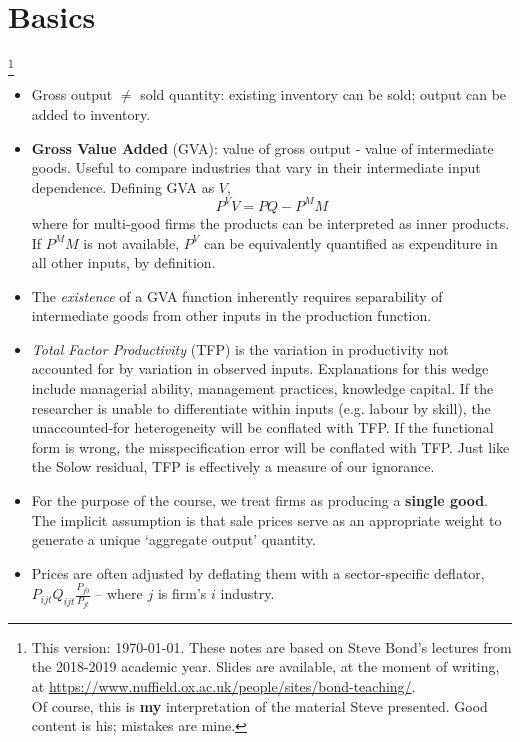 \documentclass[11pt]{article}
\newcommand\blfootnote[1]{%
	\begingroup
	\renewcommand\thefootnote{}\footnote{#1}%
	\addtocounter{footnote}{-1}%
	\endgroup
}
\begin{document}
\onehalfspacing

\tableofcontents

\section{Basics}

\blfootnote{This version: \today. These notes are based on Steve Bond's lectures from the 2018-2019 academic year. Slides are available, at the moment of writing, at \url{https://www.nuffield.ox.ac.uk/people/sites/bond-teaching/}.\\
Of course, this is \textbf{my} interpretation of the material Steve presented. Good content is his; mistakes are mine.}

\begin{itemize}
	\item Gross output $\neq$ sold quantity: existing inventory can be sold; output can be added to inventory.
	\item \textbf{Gross Value Added} (GVA): value of gross output - value of intermediate goods.
	Useful to compare industries that vary in their intermediate input dependence.
	Defining GVA as $V$,
	\begin{equation}
		P^V V = PQ - P^M M
	\end{equation}
	where for multi-good firms the products can be interpreted as inner products.
	If $P^M M$ is not available, $P^V$ can be equivalently quantified as expenditure in all other inputs, by definition.
	\item The \textit{existence} of a GVA function inherently requires separability of intermediate goods from other inputs in the production function.
	\item \textit{Total Factor Productivity} (TFP) is the variation in productivity not accounted for by variation in observed inputs.
	Explanations for this wedge include managerial ability, management practices, knowledge capital.
	If the researcher is unable to differentiate within inputs (e.g. labour by skill), the unaccounted-for heterogeneity will be conflated with TFP.
	If the functional form is wrong, the misspecification error will be conflated with TFP.
	Just like the Solow residual, TFP is effectively a measure of our ignorance.
	\item For the purpose of the course, we treat firms as producing a \textbf{single good}.
	The implicit assumption is that sale prices serve as an appropriate weight to generate a unique `aggregate output' quantity.
	\item Prices are often adjusted by deflating them with a sector-specific deflator, $P_{ijt}Q_{ijt}\frac{P_{j0}}{P_{jt}}$ -- where $j$ is firm's $i$ industry.

\end{itemize}
\end{document}
